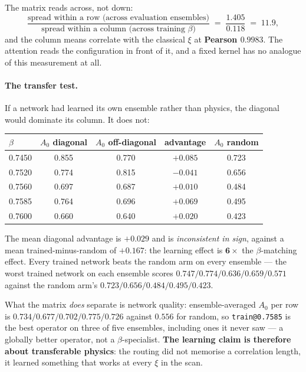 \documentclass[11pt,a4paper]{article}
\begin{document}
The matrix reads across, not down:
\begin{equation}
  \frac{\text{spread within a row (across evaluation ensembles)}}
       {\text{spread within a column (across training $\beta$)}}
  \;=\; \frac{1.405}{0.118} \;=\; \mathbf{11.9},
\end{equation}
and the column means correlate with the classical $\xi$ at \textbf{Pearson
$0.9983$}. The attention reads the configuration in front of it, and a fixed
kernel has no analogue of this measurement at all.

\paragraph{The transfer test.} If a network had learned its own ensemble rather
than physics, the diagonal would dominate its column. It does not:

\begin{center}
\begin{tabular}{@{}lcccc@{}}
\toprule
$\beta$ & $A_0$ diagonal & $A_0$ off-diagonal & advantage & $A_0$ random \\
\midrule
0.7450 & 0.855 & 0.770 & $+0.085$ & 0.723 \\
0.7520 & 0.774 & 0.815 & $\mathbf{-0.041}$ & 0.656 \\
0.7560 & 0.697 & 0.687 & $+0.010$ & 0.484 \\
0.7585 & 0.764 & 0.696 & $+0.069$ & 0.495 \\
0.7600 & 0.660 & 0.640 & $+0.020$ & 0.423 \\
\bottomrule
\end{tabular}
\end{center}

The mean diagonal advantage is $+0.029$ and is \emph{inconsistent in sign},
against a mean trained-minus-random of $+0.167$: the learning effect is
$\mathbf{6\times}$ the $\beta$-matching effect. Every trained network beats the
random arm on every ensemble --- the worst trained network on each ensemble
scores $0.747 / 0.774 / 0.636 / 0.659 / 0.571$ against the random arm's
$0.723 / 0.656 / 0.484 / 0.495 / 0.423$.

What the matrix \emph{does} separate is network quality: ensemble-averaged $A_0$
per row is $0.734 / 0.677 / 0.702 / \mathbf{0.775} / 0.726$ against $0.556$ for
random, so \texttt{train@0.7585} is the best operator on three of five
ensembles, including ones it never saw --- a globally better operator, not a
$\beta$-specialist. \textbf{The learning claim is therefore about transferable
physics}: the routing did not memorise a correlation length, it learned
something that works at every $\xi$ in the scan.
\end{document}
